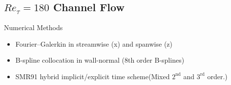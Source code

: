 \documentclass[mathserif]{beamer}
\begin{document}
\subsection{$Re_\tau = 180$ Channel Flow}
\begin{frame}
 \begin{block}{Numerical Methods}
  \begin{itemize}
   \item Fourier--Galerkin in streamwise (x) and spanwise (z)
   \item B-spline collocation in wall-normal (8th order B-splines)
   \item SMR91 hybrid implicit/explicit time scheme\footnotemark[4]
      (Mixed $2^\text{nd}$ and $3^\text{rd}$ order.)
  \end{itemize}
 \end{block}

% 


\end{frame}
\end{document}
